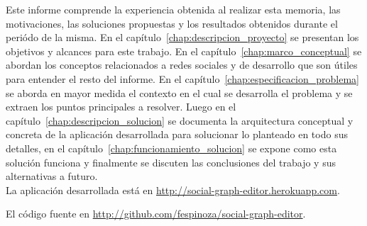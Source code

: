\begin{intro}
  Este informe comprende la experiencia obtenida al realizar esta memoria, las motivaciones, las soluciones propuestas y los resultados obtenidos durante el periódo de la misma. En el capítulo~\ref{chap:descripcion_proyecto} se presentan los objetivos y alcances para este trabajo. En el capítulo~\ref{chap:marco_conceptual} se abordan los conceptos relacionados a redes sociales y de desarrollo que son útiles para entender el resto del informe. En el capítulo~\ref{chap:especificacion_problema} se aborda en mayor medida el contexto en el cual se desarrolla el problema y se extraen los puntos principales a resolver. Luego en el capítulo~\ref{chap:descripcion_solucion} se documenta la arquitectura conceptual y concreta de la aplicación desarrollada para solucionar lo planteado en todo sus detalles, en el capítulo~\ref{chap:funcionamiento_solucion} se expone como esta solución funciona y finalmente se discuten las conclusiones del trabajo y sus alternativas a futuro.\\
  
  La aplicación desarrollada está en \url{http://social-graph-editor.herokuapp.com}.
  
  El código fuente en \url{http://github.com/fespinoza/social-graph-editor}.
  
\end{intro}